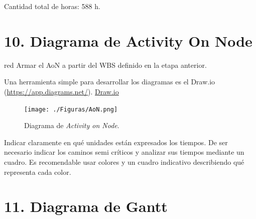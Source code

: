\documentclass[
11pt, %
]{charter}
\begin{document}
Cantidad total de horas: 588 h.

\section{10. Diagrama de Activity On Node}
\label{sec:AoN}

\begin{consigna}{red}
Armar el AoN a partir del WBS definido en la etapa anterior.

Una herramienta simple para desarrollar los diagramas es el Draw.io (\url{https://app.diagrams.net/}).
\href{https://app.diagrams.net}{Draw.io}


\begin{figure}[htpb]
\centering 
\texttt{[image: ./Figuras/AoN.png]}
\caption{Diagrama de \textit{Activity on Node}.}
\label{fig:AoN}
\end{figure}

Indicar claramente en qué unidades están expresados los tiempos.
De ser necesario indicar los caminos semi críticos y analizar sus tiempos mediante un cuadro.
Es recomendable usar colores y un cuadro indicativo describiendo qué representa cada color.

\end{consigna}

\section{11. Diagrama de Gantt}
\label{sec:gantt}
\end{document}
